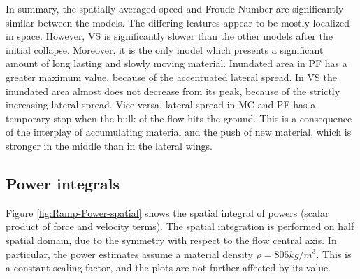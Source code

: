 \documentclass{article}
\begin{document}
In summary, the spatially averaged speed and Froude Number are significantly similar between the models. The differing features appear to be mostly localized in space. However, VS is significantly slower than the other models after the initial collapse. Moreover, it is the only model which presents a significant amount of long lasting and slowly moving material. Inundated area in PF has a greater maximum value, because of the accentuated lateral spread. In VS the inundated area almost does not decrease from its peak, because of the strictly increasing lateral spread. Vice versa, lateral spread in MC and PF has a temporary stop when the bulk of the flow hits the ground. This is a consequence of the interplay of accumulating material and the push of new material, which is stronger in the middle than in the lateral wings.

\subsection{Power integrals}
Figure \ref{fig:Ramp-Power-spatial} shows the spatial integral of powers (scalar product of force and velocity terms). The spatial integration is performed on half spatial domain, due to the symmetry with respect to the flow central axis. In particular, the power estimates assume a material density $\rho = 805 kg/m^3$. This is a constant scaling factor, and the plots are not further affected by its value.
\end{document}
